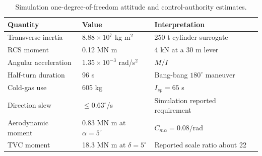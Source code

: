 \begin{table}[htbp]
\caption{Simulation one-degree-of-freedom attitude and control-authority estimates.}
\label{tab:src11}
\small
\setlength{\tabcolsep}{3.5pt}
\begin{tabularx}{\linewidth}{@{}p{.28\linewidth}p{.32\linewidth}X@{}}
\toprule
Quantity & Value & Interpretation \\
\midrule
Transverse inertia & $8.88\times10^7$ kg m$^2$ & 250 t cylinder surrogate \\
RCS moment & 0.12 MN m & 4 kN at a 30 m lever \\
Angular acceleration & $1.35\times10^{-3}$ rad/s$^2$ & $M/I$ \\
Half-turn duration & 96 s & Bang-bang $180^\circ$ maneuver \\
Cold-gas use & 605 kg & $I_{sp}=65$ s \\
Direction slew & $\le0.63^\circ$/s & Simulation reported requirement \\
Aerodynamic moment & 0.83 MN m at $\alpha=5^\circ$ & $C_{m\alpha}=0.08$/rad \\
TVC moment & 18.3 MN m at $\delta=5^\circ$ & Reported scale ratio about 22 \\
\bottomrule
\end{tabularx}
\par{}
\end{table}
